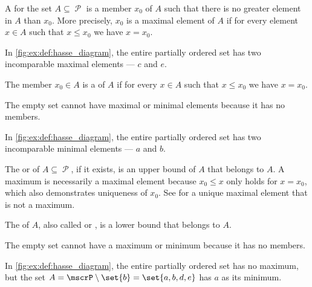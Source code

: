 \begin{definition}
\begin{thmenum}
    \begin{minipage}[t]{0.45\textwidth}
      A  for the set \( A \subseteq \mscrP \) is a member \( x_0 \) of \( A \) such that there is no greater element in \( A \) than \( x_0 \). More precisely, \( x_0 \) is a maximal element of \( A \) if for every element \( x \in A \) such that \( x \leq x_0 \) we have \( x = x_0 \).

      In \cref{fig:ex:def:hasse_diagram}, the entire partially ordered set has two incomparable maximal elements --- \( c \) and \( e \).
    \end{minipage}
    \hspace{0.02\textwidth}
    \begin{minipage}[t]{0.45\textwidth}
      The member \( x_0 \in A \) is a  of \( A \) if for every \( x \in A \) such that \( x \leq x_0 \) we have \( x = x_0 \).

      The empty set cannot have maximal or minimal elements because it has no members.

      In \cref{fig:ex:def:hasse_diagram}, the entire partially ordered set has two incomparable minimal elements --- \( a \) and \( b \).
    \end{minipage}

    \begin{minipage}[t]{0.45\textwidth}
      The  or  of \( A \subseteq \mscrP \), if it exists, is an upper bound of \( A \) that belongs to \( A \). A maximum is necessarily a maximal element because \( x_0 \leq x \) only holds for \( x = x_0 \), which also demonstrates uniqueness of \( x_0 \). See  for a unique maximal element that is not a maximum.
    \end{minipage}
    \hspace{0.02\textwidth}
    \begin{minipage}[t]{0.45\textwidth}
      The  of \( A \), also called  or , is a lower bound that belongs to \( A \).

      The empty set cannot have a maximum or minimum because it has no members.

      In \cref{fig:ex:def:hasse_diagram}, the entire partially ordered set has no maximum, but the set \( A = \mscrP \setminus \set{ b } = \set{ a, b, d, e } \) has \( a \) as its minimum.
    \end{minipage}


\end{thmenum}
\end{definition}
